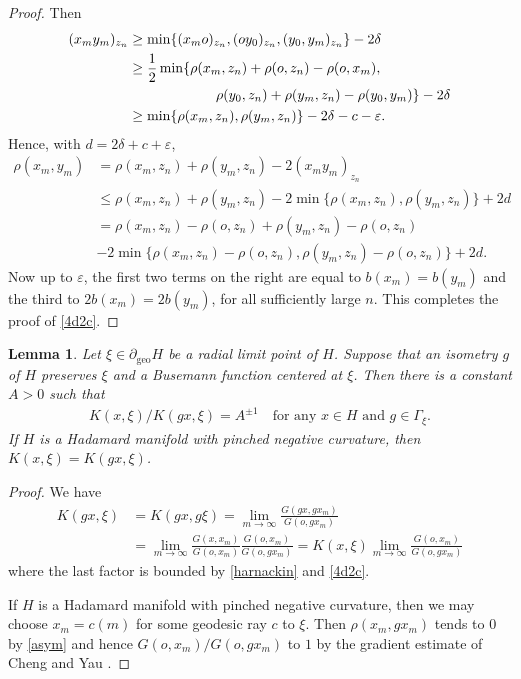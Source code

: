 \documentclass[12pt,a4paper]{amsart}
\numberwithin{equation}{section}
\newtheorem{lem}[equation]{Lemma}
\theoremstyle{definition}
\DeclareMathOperator{\geo}{geo}
\def\ve{\varepsilon}
\begin{document}
\begin{proof}
Then
\begin{align*}
	(x_my_m)_{z_n} 
	&\ge \min\{(x_mo)_{z_n},(oy_0)_{z_n},(y_0,y_m)_{z_n}\} - 2\delta \\
	&\ge \frac12\min\{\rho(x_m,z_n)+\rho(o,z_n)-\rho(o,x_m), \\
	&\hspace{22mm}\rho(y_0,z_n)+\rho(y_m,z_n)-\rho(y_0,y_m)\} - 2\delta \\
	&\ge \min\{\rho(x_m,z_n),\rho(y_m,z_n)\} - 2\delta - c - \ve.
\end{align*}
Hence, with $d=2\delta + c + \ve$,
\begin{align*}
	\rho(x_m,y_m)
	&= \rho(x_m,z_n) + \rho(y_m,z_n) - 2(x_my_m)_{z_n} \\
	&\le \rho(x_m,z_n) + \rho(y_m,z_n) - 2\min\{\rho(x_m,z_n),\rho(y_m,z_n)\} + 2d\\
	&=  \rho(x_m,z_n) - \rho(o,z_n) + \rho(y_m,z_n) - \rho(o,z_n) \\
	&- 2\min\{\rho(x_m,z_n)-\rho(o,z_n),\rho(y_m,z_n)-\rho(o,z_n)\} + 2d.
\end{align*}
Now up to $\ve$, the first two terms on the right are equal to $b(x_m)=b(y_m)$
and the third to $2b(x_m)=2b(y_m)$, for all sufficiently large $n$.
This completes the proof of \cref{4d2c}.
\end{proof}

\begin{lem}\label{Minv}
Let $\xi\in\partial_{\geo}H$ be a radial limit point of $H$.
Suppose that an isometry $g$ of $H$ preserves $\xi$ and a Busemann function centered at $\xi$.
Then there is a constant $A>0$ such that
\begin{align*}
    K(x,\xi)/K(gx,\xi) = A^{\pm1} \quad\text{for any $x\in H$ and $g\in\Gamma_\xi$.}
\end{align*}
If $H$ is a Hadamard manifold with pinched negative  curvature, then $K(x,\xi)=K(gx,\xi)$.
\end{lem}

\begin{proof}
We have
\begin{align*}
    K(gx,\xi) &= K(gx,g\xi) = \lim_{m\to\infty}\frac{G(gx,gx_m)}{G(o,gx_m)} \\
    &= \lim_{m\to\infty}\frac{G(x,x_m)}{G(o,x_m)}\frac{G(o,x_m)}{G(o,gx_m)}
    = K(x,\xi)\lim_{m\to\infty}\frac{G(o,x_m)}{G(o,gx_m)}
\end{align*}
where the last factor is bounded by \ref{harnackin} and \cref{4d2c}.

If $H$ is a Hadamard manifold with pinched negative curvature, then we may choose $x_m=c(m)$ for some geodesic ray $c$ to $\xi$.
Then $\rho(x_m,gx_m)$ tends to $0$ by \cref{asym} and hence $G(o,x_m)/G(o,gx_m)$ to $1$ by the gradient estimate of Cheng and Yau \cite[Theorem 6]{CY}. 
\end{proof}
\end{document}
